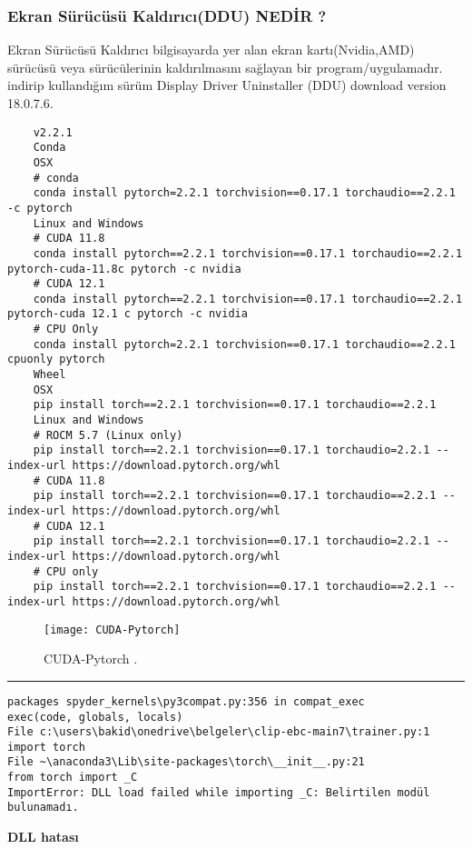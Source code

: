 \documentclass[10pt,a4paper]{report}
\begin{document}
	
		\subsubsection{Ekran Sürücüsü Kaldırıcı(DDU) NEDİR ?}
	\begin{justify}
			Ekran Sürücüsü Kaldırıcı bilgisayarda yer alan ekran kartı(Nvidia,AMD) sürücüsü veya sürücülerinin kaldırılmasını sağlayan bir program/uygulamadır.
		indirip kullandığım sürüm Display Driver Uninstaller (DDU) download version 18.0.7.6\cite{DDU}.\newline
	\end{justify}
\clearpage

\lstset{breaklines=true, breakatwhitespace=true, basicstyle=\ttfamily}

\begin{lstlisting}
	v2.2.1
	Conda
	OSX
	# conda
	conda install pytorch=2.2.1 torchvision==0.17.1 torchaudio==2.2.1 -c pytorch
	Linux and Windows
	# CUDA 11.8
	conda install pytorch==2.2.1 torchvision==0.17.1 torchaudio==2.2.1 pytorch-cuda-11.8c pytorch -c nvidia
	# CUDA 12.1
	conda install pytorch==2.2.1 torchvision==0.17.1 torchaudio==2.2.1 pytorch-cuda 12.1 c pytorch -c nvidia
	# CPU Only
	conda install pytorch=2.2.1 torchvision==0.17.1 torchaudio==2.2.1 cpuonly pytorch
	Wheel
	OSX
	pip install torch==2.2.1 torchvision==0.17.1 torchaudio==2.2.1
	Linux and Windows
	# ROCM 5.7 (Linux only)
	pip install torch==2.2.1 torchvision==0.17.1 torchaudio=2.2.1 --index-url https://download.pytorch.org/whl
	# CUDA 11.8
	pip install torch==2.2.1 torchvision==0.17.1 torchaudio==2.2.1 --index-url https://download.pytorch.org/whl
	# CUDA 12.1
	pip install torch==2.2.1 torchvision==0.17.1 torchaudio=2.2.1 --index-url https://download.pytorch.org/whl
	# CPU only
	pip install torch==2.2.1 torchvision==0.17.1 torchaudio==2.2.1 --index-url https://download.pytorch.org/whl
\end{lstlisting}



\begin{landscape} %
	
	\begin{figure*}[p]
		\centering
		\texttt{[image: CUDA-Pytorch]}
		\caption{CUDA-Pytorch \cite{pytorch}.}
	\end{figure*}
	
	
\end{landscape}
	
\clearpage
\rule{\linewidth}{0.65pt}	
\begin{verbatim}
packages spyder_kernels\py3compat.py:356 in compat_exec
exec(code, globals, locals)
File c:\users\bakid\onedrive\belgeler\clip-ebc-main7\trainer.py:1
import torch
File ~\anaconda3\Lib\site-packages\torch\__init__.py:21
from torch import _C
ImportError: DLL load failed while importing _C: Belirtilen modül bulunamadı.
\end{verbatim}
\centering\textbf{DLL hatası}\newline
	
\end{document}
